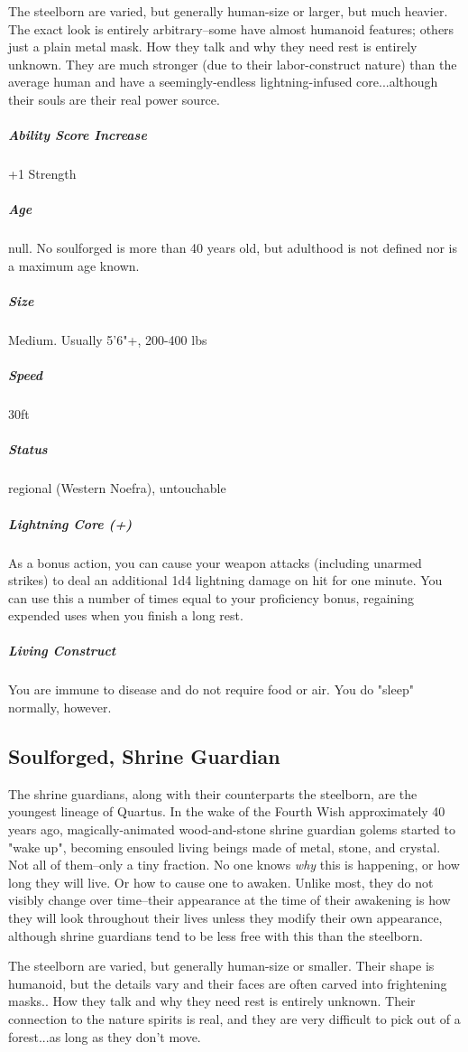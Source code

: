 The steelborn are varied, but generally human-size or larger, but much heavier. The exact look is entirely arbitrary--some have almost humanoid features; others just a plain metal mask. How they talk and why they need rest is entirely unknown. They are much stronger (due to their labor-construct nature) than the average human and have a seemingly-endless lightning-infused core...although their souls are their real power source.

\subparagraph*{Ability Score Increase}  +1 Strength

\subparagraph*{Age}  null. No soulforged is more than 40 years old, but adulthood is not defined nor is a maximum age known.

\subparagraph*{Size}  Medium. Usually 5'6"+, 200-400 lbs

\subparagraph*{Speed}  30ft
\subparagraph*{Status}  regional (Western Noefra), untouchable

\subparagraph*{Lightning Core (+)}  As a bonus action, you can cause your weapon attacks (including unarmed strikes) to deal an additional 1d4 lightning damage on hit for one minute. You can use this a number of times equal to your proficiency bonus, regaining expended uses when you finish a long rest.

\subparagraph*{Living Construct}  You are immune to disease and do not require food or air. You do "sleep" normally, however.

\subsection{Soulforged, Shrine Guardian} \label{lineage:shrine-guardian}

The shrine guardians, along with their counterparts the steelborn, are the youngest lineage of Quartus. In the wake of the Fourth Wish approximately 40 years ago, magically-animated wood-and-stone shrine guardian golems started to "wake up", becoming ensouled living beings made of metal, stone, and crystal. Not all of them--only a tiny fraction. No one knows \textit{why} this is happening, or how long they will live. Or how to cause one to awaken. Unlike most, they do not visibly change over time--their appearance at the time of their awakening is how they will look throughout their lives unless they modify their own appearance, although shrine guardians tend to be less free with this than the steelborn.

The steelborn are varied, but generally human-size or smaller. Their shape is humanoid, but the details vary and their faces are often carved into frightening masks.. How they talk and why they need rest is entirely unknown. Their connection to the nature spirits is real, and they are very difficult to pick out of a forest...as long as they don't move.

